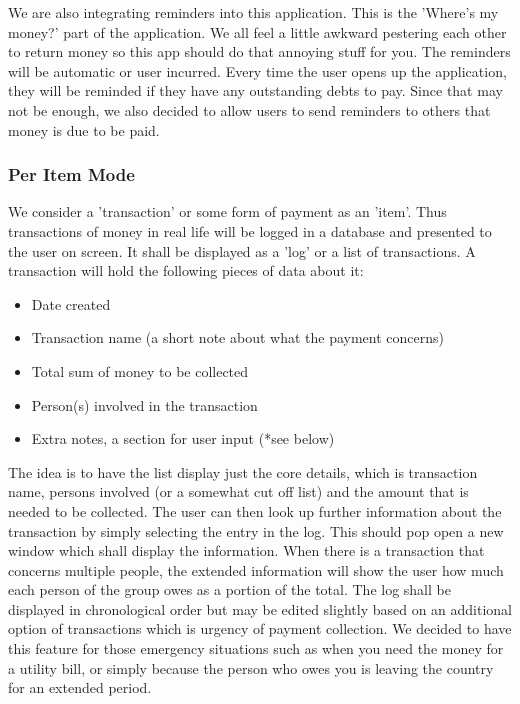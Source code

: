\documentclass[a4paper,9t]{article}
\begin{document}
We are also integrating reminders into this application. This is the 'Where's my money?' part of the application. We all feel a little awkward pestering each other to return money so this app should do that annoying stuff for you.
The reminders will be automatic or user incurred. Every time the user opens up the application, they will be reminded if they have any outstanding debts to pay. Since that may not be enough, we also decided to allow users to send reminders to others that money is due to be paid. 

\subsubsection*{Per Item Mode}
We consider a 'transaction' or some form of payment as an 'item'. Thus transactions of money in real life will be logged in a database and presented to the user on screen. It shall be displayed as a 'log' or a list of transactions. 
A transaction will hold the following pieces of data about it:
\begin{itemize}
\item{Date created}
\item{Transaction name (a short note about what the payment concerns)}
\item{Total sum of money to be collected}
\item{Person(s) involved in the transaction}
\item{Extra notes, a section for user input (*see below)}
\end{itemize}
The idea is to have the list display just the core details, which is transaction name, persons involved (or a somewhat cut off list) and the amount that is needed to be collected. The user can then look up further information about the transaction by simply selecting the entry in the log. This should pop open a new window which shall display the information. When there is a transaction that concerns multiple people, the extended information will show the user how much each person of the group owes as a portion of the total.
The log shall be displayed in chronological order but may be edited slightly based on an additional option of transactions which is urgency of payment collection. We decided to have this feature for those emergency situations such as when you need the money for a utility bill, or simply because the person who owes you is leaving the country for an extended period.
\end{document}
